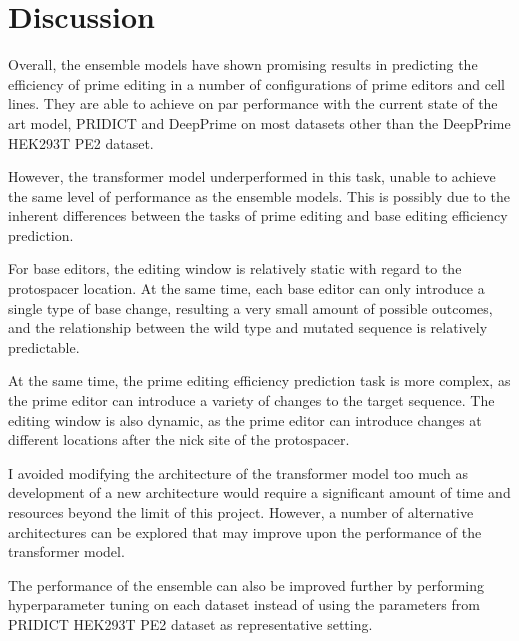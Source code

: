 \chapter{Discussion}

Overall, the ensemble models have shown promising results in predicting the efficiency of prime editing in a number of configurations of prime editors and cell lines. They are able to achieve on par performance with the current state of the art model, PRIDICT and DeepPrime on most datasets other than the DeepPrime HEK293T PE2 dataset. 

However, the transformer model underperformed in this task, unable to achieve the same level of performance as the ensemble models. This is possibly due to the inherent differences between the tasks of prime editing and base editing efficiency prediction. 

For base editors, the editing window is relatively static with regard to the protospacer location. At the same time, each base editor can only introduce a single type of base change, resulting a very small amount of possible outcomes, and the relationship between the wild type and mutated sequence is relatively predictable.

At the same time, the prime editing efficiency prediction task is more complex, as the prime editor can introduce a variety of changes to the target sequence. The editing window is also dynamic, as the prime editor can introduce changes at different locations after the nick site of the protospacer. 

I avoided modifying the architecture of the transformer model too much as development of a new architecture would require a significant amount of time and resources beyond the limit of this project. However, a number of alternative architectures can be explored that may improve upon the performance of the transformer model. 

The performance of the ensemble can also be improved further by performing hyperparameter tuning on each dataset instead of using the parameters from PRIDICT HEK293T PE2 dataset as representative setting. 